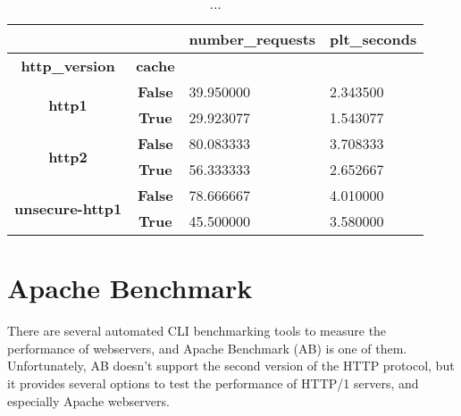 \documentclass[a4paper,10pt]{article}
\begin{document}
\begin{table}[h!]
\centering
\begin{tabular}{|c|c|l|l|}
\hline
\multicolumn{1}{|r|}{\textbf{}}          & \multicolumn{1}{r|}{\textbf{}} & \multicolumn{1}{r|}{\textbf{number\_requests}} & \multicolumn{1}{r|}{\textbf{plt\_seconds}} \\ \hline
\textbf{http\_version}                   & \textbf{cache}                 & \multicolumn{1}{c|}{\textbf{}}                 & \multicolumn{1}{c|}{\textbf{}}             \\ \hline
\multirow{2}{*}{\textbf{http1}}          & \textbf{False}                 & 39.950000                                      & 2.343500                                   \\ \cline{2-4} 
                                         & \textbf{True}                  & 29.923077                                      & 1.543077                                   \\ \hline
\multirow{2}{*}{\textbf{http2}}          & \textbf{False}                 & 80.083333                                      & 3.708333                                   \\ \cline{2-4} 
                                         & \textbf{True}                  & 56.333333                                      & 2.652667                                   \\ \hline
\multirow{2}{*}{\textbf{unsecure-http1}} & \textbf{False}                 & 78.666667                                      & 4.010000                                   \\ \cline{2-4} 
                                         & \textbf{True}                  & 45.500000                                      & 3.580000                                   \\ \hline
\end{tabular}

\caption{...}
\label{fig:table2}
\end{table}


\clearpage



\section{Apache Benchmark}

There are several automated CLI benchmarking tools to measure the performance of webservers, and Apache Benchmark (AB) is one of them. Unfortunately, AB doesn't support the second version of the HTTP protocol, but it provides several options to test the performance of HTTP/1 servers, and especially Apache webservers.
\end{document}
